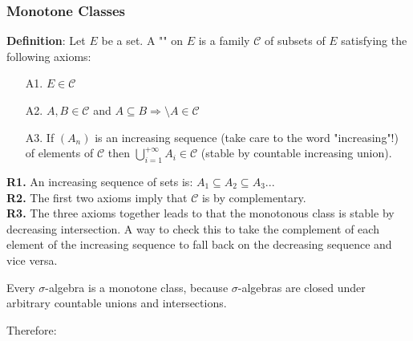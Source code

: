 	\pagebreak
	\subsubsection{Monotone Classes}
	\textbf{Definition}: Let $E$ be a set. A "" on $E$ is a family $\mathcal{C}$ of subsets of $E$ satisfying the following axioms:
	\begin{enumerate}
		\item[A1.] $E\in \mathcal{C}$
		\item[A2.] $A,B\in \mathcal{C}$ and $A\subseteq B \Rightarrow \setminus A\in \mathcal{C}$
		\item[A3.] If $(A_n)$ is an increasing sequence (take care to the word "increasing"!) of elements of $\mathcal{C}$ then $\displaystyle\bigcup_{i=1}^{+\infty} A_i\in \mathcal{C}$ (stable by countable increasing union).
	\end{enumerate}
	\begin{tcolorbox}[title=Remarks,colframe=black,arc=10pt]
	\textbf{R1.} An increasing sequence of sets is: $A_1\subseteq A_2\subseteq A_3 ...$\\
	
	\textbf{R2.} The first two axioms imply that $\mathcal{C}$ is by complementary.\\
	
	\textbf{R3.} The three axioms together leads to that the monotonous class is stable by decreasing intersection. A way to check this to take the complement of each element of the increasing sequence to fall back on the decreasing sequence and vice versa.
	\end{tcolorbox}
	Every $\sigma$-algebra is a monotone class, because $\sigma$-algebras are closed under arbitrary countable unions and intersections.
	
	Therefore:
	
